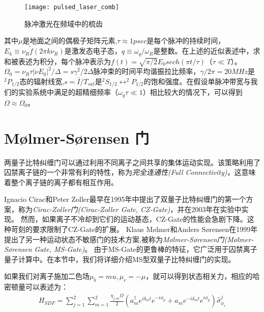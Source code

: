 \begin{figure}
    \centering
    \caption[脉冲激光在频域中的梳齿]{脉冲激光在频域中的梳齿\label{fig:pulsed_laser_comb}}
    \texttt{[image: pulsed\_laser\_comb]}
\end{figure}

其中$\mu$是地面之间的偶极子矩阵元素,$\tau\approx 1 psec$是每个脉冲的持续时间，$E_k\equiv \nu_R\tilde{f}(2\pi k\nu_R)$是激发态电子态，$q\equiv\omega_q/\omega_R$是整数。在上述的近似表述中，求和被表述为积分，每个脉冲表示为$f(t)=\sqrt{\pi/2}E_0 sech(\pi t/\tau)$（$\tau\ll T$）。$\Omega_0=\nu_R\tau|\nu E_0|^2/\Delta=s\gamma^2/2\Delta$脉冲束的时间平均谐振拉比频率，$\gamma/2\pi=20MHz$是$^2P_{1/2}$态的辐射线宽,$s=\bar{I}/T_{sat}$是$^2S_{1/2}\leftrightarrow ^2P_{1/2}$的饱和强度。在假设单脉冲带宽与我们的实验系统中满足的超精细频率（$\omega_q\tau\ll 1$）相比较大的情况下，可以得到$\Omega\approx\Omega_0$。

\section[Mølmer-Sørensen 门]{Mølmer-Sørensen 门}

两量子比特纠缠门可以通过利用不同离子之间共享的集体运动实现。该策略利用了囚禁离子链的一个非常有利的特性，称为\emph{完全连通性(Full Connectivity)}，这意味着整个离子链的离子都有相互作用。

Ignacio Cirac和Peter Zoller最早在1995年中提出了双量子比特纠缠门的第一个方案\cite[]{Cirac_Zoller_2002}，称为\emph{Cirac-Zoller门(Cirac-Zoller Gate, CZ-Gate)}，并在2003年在实验中实现\cite[]{Schmidt_Kaler_Häffner_Riebe_Gulde_Lancaster_Deuschle_Becher_Roos_Eschner_Blatt_2003}。
然而，如果离子不冷却到它们的运动基态，CZ-Gate的性能会急剧下降。这种苛刻的要求限制了CZ-Gate的扩展。
Klaus Mølmer和Anders Sørensen在1999年提出了另一种运动状态不敏感门的技术方案\cite[]{Sørensen_Mølmer_2002},被称为\emph{Mølmer-Sørensen门(Mølmer-Sørensen Gate, MS-Gate)}。
由于MS-Gate的更鲁棒的特征，它广泛用于囚禁离子量子计算中。在本节中，我们将详细介绍MS型双量子比特纠缠门的实现。

如果我们对离子施加二色场$\mu_b=mu, \mu_r=-\mu$，就可以得到状态相关力，相应的哈密顿量可以表述为：
\begin{align}
    H_{SDF}=\sum_{j=1}^{2}\sum_{m=1}^{2}\frac{\eta_{j,m}\Omega}{2}\left(a_m^\dagger e^{i\delta_m t}e^{-i\phi_p}+a_m e^{-i\delta_m t}e^{i\phi_p}\right)\hat{\sigma}_{\phi_s}^j
\end{align}

